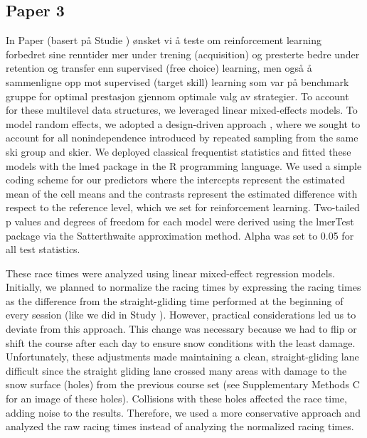 \subsection{Paper 3}
In Paper  (basert på Studie ) ønsket vi å teste om reinforcement learning forbedret sine renntider mer under trening (acquisition) og presterte bedre under retention og transfer enn supervised (free choice) learning, men også å sammenligne opp mot supervised (target skill) learning som var på benchmark gruppe for optimal prestasjon gjennom optimale valg av strategier. To account for these multilevel data structures, we leveraged linear mixed-effects models. To model random effects, we adopted a design-driven approach \cite{barr_random_2013, barr_learning_2021}, where we sought to account for all nonindependence introduced by repeated sampling from the same ski group and skier. We deployed classical frequentist statistics and fitted these models with the lme4 package \cite{bates_fitting_2015} in the R \cite{r_core_team_r_2022} programming language. We used a simple coding scheme for our predictors where the intercepts represent the estimated mean of the cell means and the contrasts represent the estimated difference with respect to the reference level, which we set for reinforcement learning. Two-tailed p values and degrees of freedom for each model were derived using the lmerTest package \cite{kuznetsova_lmertest_2017} via the Satterthwaite approximation method. Alpha was set to 0.05 for all test statistics.




These race times were analyzed using linear mixed-effect regression models. Initially, we planned to normalize the racing times by expressing the racing times as the difference from the straight-gliding time performed at the beginning of every session (like we did in Study ). However, practical considerations led us to deviate from this approach. This change was necessary because we had to flip or shift the course after each day to ensure snow conditions with the least damage. Unfortunately, these adjustments made maintaining a clean, straight-gliding lane difficult since the straight gliding lane crossed many areas with damage to the snow surface (holes) from the previous course set (see Supplementary Methods C for an image of these holes). Collisions with these holes affected the race time, adding noise to the results. Therefore, we used a more conservative approach and analyzed the raw racing times instead of analyzing the normalized racing times.

